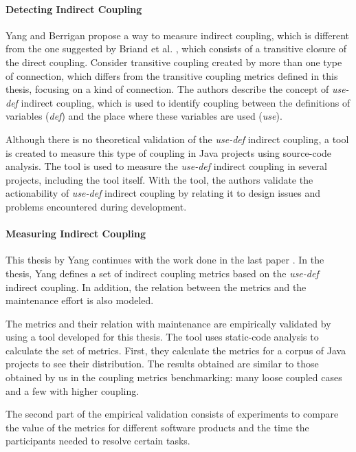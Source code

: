 \paragraph{Detecting Indirect Coupling \cite{yang2005detecting}}

Yang and Berrigan propose a way to measure indirect coupling, which is different from the one suggested by Briand et al. \cite{briand1999unified}, which consists of a transitive closure of the direct coupling. Consider transitive coupling created by more than one type of connection, which differs from the transitive coupling metrics defined in this thesis, focusing on a kind of connection. The authors describe the concept of \textit{use-def} indirect coupling, which is used to identify coupling between the definitions of variables (\textit{def}) and the place where these variables are used (\textit{use}).

Although there is no theoretical validation of the \textit{use-def} indirect coupling, a tool is created to measure this type of coupling in Java projects using source-code analysis. The tool is used to measure the \textit{use-def} indirect coupling in several projects, including the tool itself. With the tool, the authors validate the actionability of \textit{use-def} indirect coupling by relating it to design issues and problems encountered during development.

\paragraph{Measuring Indirect Coupling \cite{Yang2010}}

This thesis by Yang continues with the work done in the last paper \cite{yang2005detecting}. In the thesis, Yang defines a set of indirect coupling metrics based on the \textit{use-def} indirect coupling. In addition, the relation between the metrics and the maintenance effort is also modeled.

The metrics and their relation with maintenance are empirically validated by using a tool developed for this thesis. The tool uses static-code analysis to calculate the set of metrics. First, they calculate the metrics for a corpus of Java projects to see their distribution. The results obtained are similar to those obtained by us in the coupling metrics benchmarking: many loose coupled cases and a few with higher coupling.

The second part of the empirical validation consists of experiments to compare the value of the metrics for different software products and the time the participants needed to resolve certain tasks.

